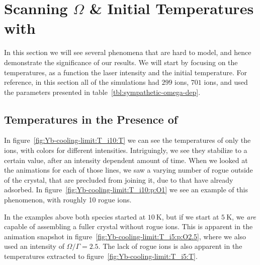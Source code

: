 \section{Scanning \texorpdfstring{$\Omega$}{Omega} \& Initial Temperatures with }\label{sec:results/sympathetic-omega-dep}

In this section we will see several phenomena that are hard to model, and hence demonstrate the significance of our results. We will start by focusing on the  temperatures, as a function the laser intensity and the initial temperature. For reference, in this section all of the simulations had $299$  ions, $701$  ions, and used the parameters presented in table~\ref{tbl:sympathetic-omega-dep}.

\begin{table}[h]
	\centering
	
	\caption{Parameters commonly used for multi-dimensional scan of Intensities ($\Omega/\Gamma$) and initial temperatures ($T_i$)}
	\label{tbl:sympathetic-omega-dep}
\end{table}

\subsection{ Temperatures in the Presence of }

In figure~\ref{fig:Yb-cooling-limit:T_i10:T} we can see the temperatures of only the  ions, with colors for different intensities. Intriguingly, we see they stabilize to a certain value, after an intensity dependent amount of time. When we looked at the animations for each of those lines, we saw a varying number of rogue  outside of the crystal, that are precluded from joining it, due to  that have already adsorbed. In figure~\ref{fig:Yb-cooling-limit:T_i10:p:O1} we see an example of this phenomenon, with roughly 10 rogue  ions.

In the examples above both species started at $10\ \mathrm{K}$, but if we start at $5\ \mathrm{K}$, we \emph{are} capable of assembling a fuller  crystal without rogue ions. This is apparent in the animation snapshot in figure~\ref{fig:Yb-cooling-limit:T_i5:p:O2.5}, where we also used an intensity of $\Omega / \Gamma = 2.5$. The lack of rogue  ions is also apparent in the temperatures extracted to figure~\ref{fig:Yb-cooling-limit:T_i5:T}.


